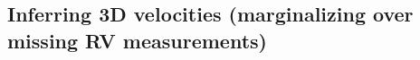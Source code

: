 
\subsection{Inferring 3D velocities (marginalizing over missing RV
measurements)}
\label{sec:inference}

